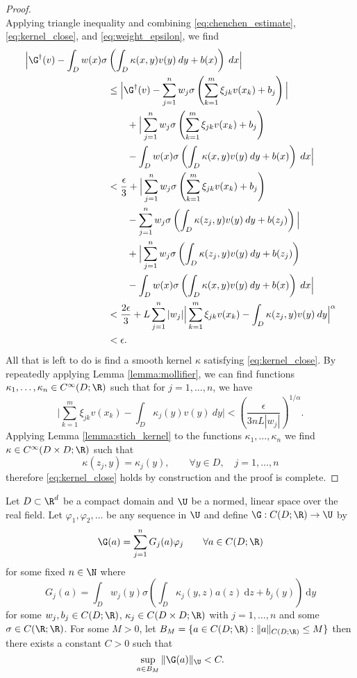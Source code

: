 {\begin{proof}
\begin{equation}
\end{equation}
Applying triangle inequality and combining \eqref{eq:chenchen_estimate}, \eqref{eq:kernel_close}, and \eqref{eq:weight_epsilon}, we find 
\begin{align*}
 \Big| \G^\dagger(v) - \int_D w(x) \sigma & \left ( \int_D \kappa (x,y)v(y) \: dy + b(x) \right ) \: dx \Big| \\
&\leq \Big| \G^\dagger(v) - \sum_{j=1}^n w_j \sigma \left ( \sum_{k=1}^m \xi_{jk} v(x_k) + b_j \right ) \Big| \\
&\qquad+ \Big|\sum_{j=1}^n w_j \sigma \left ( \sum_{k=1}^m \xi_{jk} v(x_k) + b_j \right ) \\
&\qquad- \int_D w(x) \sigma \left ( \int_D \kappa (x,y)v(y) \: dy + b(x) \right ) \: dx\Big| \\
&< \frac{\epsilon}{3} + \Big|\sum_{j=1}^n w_j \sigma \left ( \sum_{k=1}^m \xi_{jk} v(x_k) + b_j \right ) \\
&\qquad- \sum_{j=1}^n w_j \sigma \left ( \int_D \kappa(z_j, y) v(y) \: dy + b(z_j) \right )\Big| \\
&\qquad+ \Big| \sum_{j=1}^n w_j \sigma \left ( \int_D \kappa(z_j, y) v(y) \: dy + b(z_j) \right ) \\
&\qquad- \int_D w(x) \sigma \left ( \int_D \kappa (x,y)v(y) \: dy + b(x) \right ) \: dx\Big|  \\
&< \frac{2 \epsilon}{3} + L \sum_{j=1}^n |w_j| \Big|\sum_{k=1}^m \xi_{jk} v(x_k)  - \int_D \kappa(z_j,y)v(y) \: dy \Big|^\alpha \\
&< \epsilon.
\end{align*}
All that is left to do is find a smooth kernel \(\kappa\) satisfying \eqref{eq:kernel_close}. By repeatedly applying 
Lemma \ref{lemma:mollifier}, we can find functions \(\kappa_1, \dots, \kappa_n \in C^\infty (D;\R)\) such that
for \(j=1,\dots,n\), we have
\[\Big|\sum_{k=1}^m \xi_{jk} v(x_k) - \int_D \kappa_j (y) v(y) \: dy\Big| < \left ( \frac{\epsilon}{3nL|w_j|} \right )^{1/\alpha}.\]
Applying Lemma \ref{lemma:stich_kernel} to the functions \(\kappa_1, \dots, \kappa_n\) we find 
\(\kappa \in C^\infty (D \times D;\R)\) such that 
\[\kappa(z_j,y) = \kappa_j(y), \qquad \forall y \in D, \quad j=1,\dots,n\]
therefore \eqref{eq:kernel_close} holds by construction and the proof is complete. 
\end{proof}

\iffalse
\begin{lemma}
Let \(D \subset \R^d\) be a compact domain and \(\U\) be a normed, linear space over the real field. Let \(\varphi_1,\varphi_2, \dots\) be any sequence in \(\U\) and define
\(\G: C(D;\R) \to \U\) by
\[\G(a) = \sum_{j=1}^n G_j(a) \varphi_j  \qquad \forall a \in C(D;\R)\]
for some fixed \(n \in \N\) where
\[G_j(a) = \int_D w_j(y)  \sigma  \left ( \int_D \kappa_j (y,z) a(z) \: \text{d}z + b_j(y) \right) \: \text{d}y \]
for some \(w_j, b_j \in C(D;\R)\), \(\kappa_j \in C(D \times D;\R)\) with \(j=1,\dots,n\) and some \(\sigma \in C(\R;\R)\). For some \(M > 0\), let 
\(B_M = \{a \in C(D;\R) : \|a\|_{C(D;\R)} \leq M\}\) then there exists a constant \(C > 0\) such that
\[\sup_{a \in B_M} \|\G(a)\|_\U < C.\]
\end{lemma}

}
